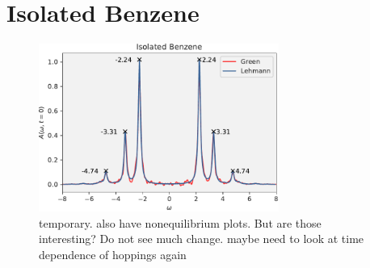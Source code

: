 \section{Isolated Benzene}
\begin{figure}[!hbt]
    \centering
    \includegraphics[width=0.7\textwidth]{graph/isolated_benzene.pdf}
    \caption{temporary. also have nonequilibrium plots. But are those interesting? Do not see much change. maybe need to look at time dependence of hoppings again}
\end{figure}
